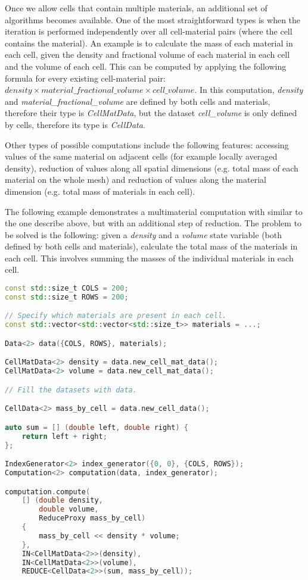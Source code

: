 \documentclass[fontsize=11pt, appendixprefix=true]{scrreprt}
\begin{document}
Once we allow cells that contain multiple materials, an additional set of
algorithms becomes available. One of the most straightforward types is when the
iteration is performed independently over all cell-material pairs (where the
cell contains the material). An example is to calculate the mass of each
material in each cell, given the density and fractional volume of each material
in each cell and the volume of each cell. This can be computed by applying the
following formula for every existing cell-material pair: $density \times
material\_fractional\_volume \times cell\_volume$. In this computation,
\textit{density} and \textit{material\_fractional\_volume} are defined by both
cells and materials, therefore their type is \textit{CellMatData}, but the
dataset \textit{cell\_volume} is only defined by cells, therefore its type is
\textit{CellData}.

Other types of possible computations include the following features: accessing
values of the same material on adjacent cells (for example locally averaged
density), reduction of values along all spatial dimensions (e.g. total mass of
each material on the whole mesh) and reduction of values along the material
dimension (e.g. total mass of materials in each cell).

The following example demonstrates a multimaterial computation with similar to
the one describe above, but with an additional step of reduction. The problem to
be solved is the following: given a \textit{density} and a \textit{volume} state
variable (both defined by both cells and materials), calculate the total mass of
the materials in each cell. This involves summing the masses of the individual
materials in each cell.

\begin{lstlisting}[language=c++]
const std::size_t COLS = 200;
const std::size_t ROWS = 200;

// Specify which materials are present in each cell.
const std::vector<std::vector<std::size_t>> materials = ...;

Data<2> data({COLS, ROWS}, materials);

CellMatData<2> density = data.new_cell_mat_data();
CellMatData<2> volume = data.new_cell_mat_data();

// Fill the datasets with data.

CellData<2> mass_by_cell = data.new_cell_data();

auto sum = [] (double left, double right) {
    return left + right;
};

IndexGenerator<2> index_generator({0, 0}, {COLS, ROWS});
Computation<2> computation(data, index_generator);

computation.compute(
    [] (double density,
        double volume,
        ReduceProxy mass_by_cell)
    {
        mass_by_cell << density * volume;
    },
    IN<CellMatData<2>>(density),
    IN<CellMatData<2>>(volume),
    REDUCE<CellData<2>>(sum, mass_by_cell));
\end{lstlisting}
\end{document}
